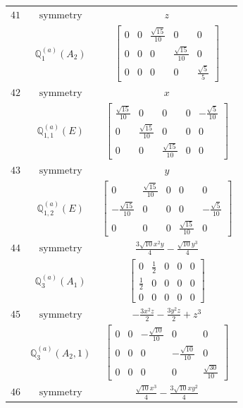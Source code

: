 \documentclass[fleqn,8pt,landscape]{jsarticle}
\begin{document}
\begin{longtable}{ccc}
$ 41 $ & $ \text{symmetry} $ & $ z $ \\
$  $ & $ \mathbb{Q}_{1}^{(a)}(A_{2}) $ & $ \begin{bmatrix} 0 & 0 & \frac{\sqrt{15}}{10} & 0 & 0 \\ 0 & 0 & 0 & \frac{\sqrt{15}}{10} & 0 \\ 0 & 0 & 0 & 0 & \frac{\sqrt{5}}{5} \end{bmatrix} $ \\ \hline
$ 42 $ & $ \text{symmetry} $ & $ x $ \\
$  $ & $ \mathbb{Q}_{1,1}^{(a)}(E) $ & $ \begin{bmatrix} \frac{\sqrt{15}}{10} & 0 & 0 & 0 & - \frac{\sqrt{5}}{10} \\ 0 & \frac{\sqrt{15}}{10} & 0 & 0 & 0 \\ 0 & 0 & \frac{\sqrt{15}}{10} & 0 & 0 \end{bmatrix} $ \\ \hline
$ 43 $ & $ \text{symmetry} $ & $ y $ \\
$  $ & $ \mathbb{Q}_{1,2}^{(a)}(E) $ & $ \begin{bmatrix} 0 & \frac{\sqrt{15}}{10} & 0 & 0 & 0 \\ - \frac{\sqrt{15}}{10} & 0 & 0 & 0 & - \frac{\sqrt{5}}{10} \\ 0 & 0 & 0 & \frac{\sqrt{15}}{10} & 0 \end{bmatrix} $ \\ \hline
$ 44 $ & $ \text{symmetry} $ & $ \frac{3 \sqrt{10} x^{2} y}{4} - \frac{\sqrt{10} y^{3}}{4} $ \\
$  $ & $ \mathbb{Q}_{3}^{(a)}(A_{1}) $ & $ \begin{bmatrix} 0 & \frac{1}{2} & 0 & 0 & 0 \\ \frac{1}{2} & 0 & 0 & 0 & 0 \\ 0 & 0 & 0 & 0 & 0 \end{bmatrix} $ \\ \hline
$ 45 $ & $ \text{symmetry} $ & $ - \frac{3 x^{2} z}{2} - \frac{3 y^{2} z}{2} + z^{3} $ \\
$  $ & $ \mathbb{Q}_{3}^{(a)}(A_{2},1) $ & $ \begin{bmatrix} 0 & 0 & - \frac{\sqrt{10}}{10} & 0 & 0 \\ 0 & 0 & 0 & - \frac{\sqrt{10}}{10} & 0 \\ 0 & 0 & 0 & 0 & \frac{\sqrt{30}}{10} \end{bmatrix} $ \\ \hline
$ 46 $ & $ \text{symmetry} $ & $ \frac{\sqrt{10} x^{3}}{4} - \frac{3 \sqrt{10} x y^{2}}{4} $ \\

\end{longtable}
\end{document}

